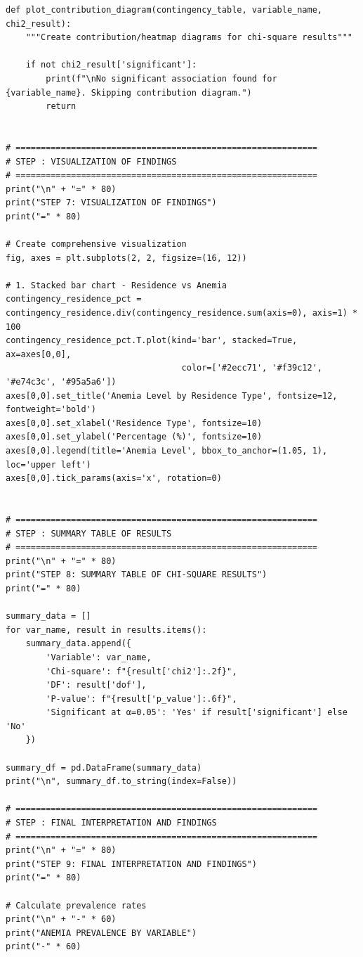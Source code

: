 \documentclass[12pt]{article}
\begin{document}
\begin{verbatim}
def plot_contribution_diagram(contingency_table, variable_name, chi2_result):
    """Create contribution/heatmap diagrams for chi-square results"""
    
    if not chi2_result['significant']:
        print(f"\nNo significant association found for {variable_name}. Skipping contribution diagram.")
        return
    

# ============================================================
# STEP : VISUALIZATION OF FINDINGS
# ============================================================
print("\n" + "=" * 80)
print("STEP 7: VISUALIZATION OF FINDINGS")
print("=" * 80)

# Create comprehensive visualization
fig, axes = plt.subplots(2, 2, figsize=(16, 12))

# 1. Stacked bar chart - Residence vs Anemia
contingency_residence_pct = contingency_residence.div(contingency_residence.sum(axis=0), axis=1) * 100
contingency_residence_pct.T.plot(kind='bar', stacked=True, ax=axes[0,0], 
                                   color=['#2ecc71', '#f39c12', '#e74c3c', '#95a5a6'])
axes[0,0].set_title('Anemia Level by Residence Type', fontsize=12, fontweight='bold')
axes[0,0].set_xlabel('Residence Type', fontsize=10)
axes[0,0].set_ylabel('Percentage (%)', fontsize=10)
axes[0,0].legend(title='Anemia Level', bbox_to_anchor=(1.05, 1), loc='upper left')
axes[0,0].tick_params(axis='x', rotation=0)


# ============================================================
# STEP : SUMMARY TABLE OF RESULTS
# ============================================================
print("\n" + "=" * 80)
print("STEP 8: SUMMARY TABLE OF CHI-SQUARE RESULTS")
print("=" * 80)

summary_data = []
for var_name, result in results.items():
    summary_data.append({
        'Variable': var_name,
        'Chi-square': f"{result['chi2']:.2f}",
        'DF': result['dof'],
        'P-value': f"{result['p_value']:.6f}",
        'Significant at α=0.05': 'Yes' if result['significant'] else 'No'
    })

summary_df = pd.DataFrame(summary_data)
print("\n", summary_df.to_string(index=False))

# ============================================================
# STEP : FINAL INTERPRETATION AND FINDINGS
# ============================================================
print("\n" + "=" * 80)
print("STEP 9: FINAL INTERPRETATION AND FINDINGS")
print("=" * 80)

# Calculate prevalence rates
print("\n" + "-" * 60)
print("ANEMIA PREVALENCE BY VARIABLE")
print("-" * 60)


\end{verbatim}
\end{document}
